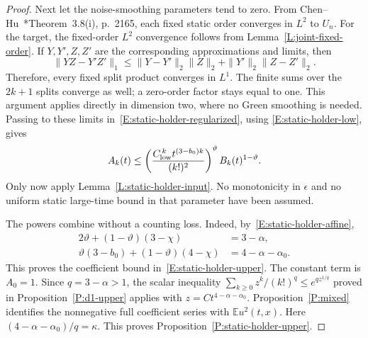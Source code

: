 \documentclass[12pt]{article}
\numberwithin{equation}{section}
\theoremstyle{definition}
\newcommand{\E}{\mathbb{E}}
\begin{document}
\begin{proof}
  Next let the noise-smoothing parameters tend to zero. From
  Chen--Hu~\cite{chen.hu:25:hyperbolic}*{Theorem~3.8(i), p.~2165},
  each fixed static order converges in $L^2$ to $U_n$.
  For the target, the fixed-order $L^2$ convergence follows from
  Lemma~\ref{L:joint-fixed-order}. If $Y,Y',Z,Z'$ are the corresponding
  approximations and limits, then
  \[
    \|YZ-Y'Z'\|_1
    \le\|Y-Y'\|_2\|Z\|_2+\|Y'\|_2\|Z-Z'\|_2.
  \]
  Therefore, every fixed split product converges in $L^1$. The finite
  sums over the $2k+1$ splits converge as well; a zero-order factor
  stays equal to one. This argument applies directly in dimension two,
  where no Green smoothing is needed. Passing to these limits
  in~\eqref{E:static-holder-regularized}, using
  \eqref{E:static-holder-low}, gives
  \[
    A_k(t)\le
    \left(\frac{C_{\rm low}^{\,k}t^{(3-b_0)k}}{(k!)^2}\right)^\vartheta
    B_k(t)^{1-\vartheta}.
  \]
  Only now apply Lemma~\ref{L:static-holder-input}. No monotonicity
  in $\epsilon$ and no uniform static large-time bound in that
  parameter have been assumed.

  The powers combine without a counting loss. Indeed,
  by~\eqref{E:static-holder-affine},
  \[
    \begin{split}
      2\vartheta+(1-\vartheta)(3-\chi)&=3-\alpha,\\
      \vartheta(3-b_0)+(1-\vartheta)(4-\chi)
      &=4-\alpha-\alpha_0.
    \end{split}
  \]
  This proves the coefficient bound in~\eqref{E:static-holder-upper}.
  The constant term is $A_0=1$. Since $q=3-\alpha>1$, the scalar
  inequality $\sum_{k\ge0}z^k/(k!)^q\le e^{qz^{1/q}}$ proved in
  Proposition~\ref{P:d1-upper} applies with
  $z=Ct^{4-\alpha-\alpha_0}$. Proposition~\ref{P:mixed} identifies
  the nonnegative full coefficient series with $\E u^2(t,x)$.
  Here $(4-\alpha-\alpha_0)/q=\kappa$. This proves
  Proposition~\ref{P:static-holder-upper}.
\end{proof}
\end{document}
